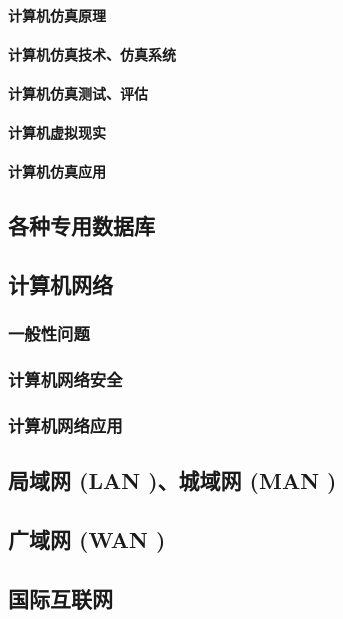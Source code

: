 \documentclass[UTF8]{../../ApplicationUniverse}
\begin{document}
            \paragraph{计算机仿真原理}
            \paragraph{计算机仿真技术、仿真系统}
            \paragraph{计算机仿真测试、评估}
            \paragraph{计算机虚拟现实}
            \paragraph{计算机仿真应用}
    \subsection{各种专用数据库}
    \subsection{计算机网络}
        \subsubsection{一般性问题}
        \subsubsection{计算机网络安全}
        \subsubsection{计算机网络应用}
    \subsection{局域网 (LAN )、城域网 (MAN )}
    \subsection{广域网 (WAN )}
    \subsection{国际互联网}
\end{document}
